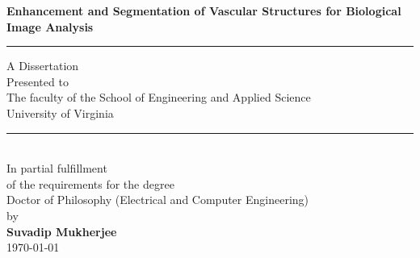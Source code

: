 \documentclass[12pt, oneside]{Thesis} %
\title{\ttitle} %
\begin{document}
\frontmatter %

\fancyhead{} %
\rhead{\thepage} %
\lhead{} %

\pagestyle{fancy} %

\newcommand{\HRule}{\rule{\linewidth}{0.5mm}} %

\hypersetup{pdfsubject=\subjectname}
\hypersetup{pdfauthor=\authornames}
\hypersetup{pdfkeywords=\keywordnames}


\begin{titlepage}
\begin{center}

\textbf{\Large Enhancement and Segmentation of Vascular Structures for Biological Image Analysis} \\[1cm] 

\HRule

A Dissertation \\ [0.2cm]
Presented to \\ [0.2cm]
The faculty of the School of Engineering and Applied Science \\ [0.2cm]
University of Virginia 
\HRule
\\[1cm]


In partial fulfillment \\ [0.2cm]
of the requirements for the degree \\ [0.2cm]
Doctor of Philosophy (Electrical and Computer Engineering) \\[1.5cm]

by \\[1cm]

\textbf{Suvadip Mukherjee} \\
\today
 
\vfill
\end{center}
\end{titlepage}


\clearpage
\pagestyle{empty}

\end{document}
